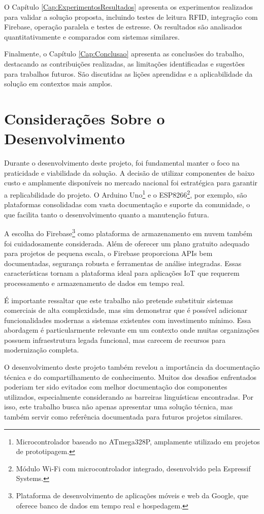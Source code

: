 O Capítulo \ref{Cap:ExperimentosResultados} apresenta os experimentos realizados para validar a solução proposta, incluindo testes de leitura RFID, integração com Firebase, operação paralela e testes de estresse. Os resultados são analisados quantitativamente e comparados com sistemas similares.

Finalmente, o Capítulo \ref{Cap:Conclusao} apresenta as conclusões do trabalho, destacando as contribuições realizadas, as limitações identificadas e sugestões para trabalhos futuros. São discutidas as lições aprendidas e a aplicabilidade da solução em contextos mais amplos.

\section{Considerações Sobre o Desenvolvimento}

Durante o desenvolvimento deste projeto, foi fundamental manter o foco na praticidade e viabilidade da solução. A decisão de utilizar componentes de baixo custo e amplamente disponíveis no mercado nacional foi estratégica para garantir a replicabilidade do projeto. O Arduino Uno\footnote{Microcontrolador baseado no ATmega328P, amplamente utilizado em projetos de prototipagem.} e o ESP8266\footnote{Módulo Wi-Fi com microcontrolador integrado, desenvolvido pela Espressif Systems.}, por exemplo, são plataformas consolidadas com vasta documentação e suporte da comunidade, o que facilita tanto o desenvolvimento quanto a manutenção futura.

A escolha do Firebase\footnote{Plataforma de desenvolvimento de aplicações móveis e web da Google, que oferece banco de dados em tempo real e hospedagem.} como plataforma de armazenamento em nuvem também foi cuidadosamente considerada. Além de oferecer um plano gratuito adequado para projetos de pequena escala, o Firebase proporciona APIs bem documentadas, segurança robusta e ferramentas de análise integradas. Essas características tornam a plataforma ideal para aplicações IoT que requerem processamento e armazenamento de dados em tempo real.

É importante ressaltar que este trabalho não pretende substituir sistemas comerciais de alta complexidade, mas sim demonstrar que é possível adicionar funcionalidades modernas a sistemas existentes com investimento mínimo. Essa abordagem é particularmente relevante em um contexto onde muitas organizações possuem infraestrutura legada funcional, mas carecem de recursos para modernização completa.

O desenvolvimento deste projeto também revelou a importância da documentação técnica e do compartilhamento de conhecimento. Muitos dos desafios enfrentados poderiam ter sido evitados com melhor documentação dos componentes utilizados, especialmente considerando as barreiras linguísticas encontradas. Por isso, este trabalho busca não apenas apresentar uma solução técnica, mas também servir como referência documentada para futuros projetos similares.
